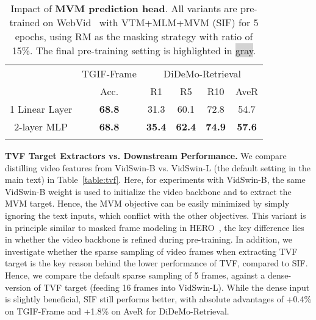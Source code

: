 \documentclass[10pt,twocolumn,letterpaper]{article}
\newlength\savewidth
\newcommand\shline{\noalign{\global\savewidth\arrayrulewidth\global\arrayrulewidth 1pt}\hline\noalign{\global\arrayrulewidth\savewidth}}
\newcommand{\tablestyle}[2]{\setlength{\tabcolsep}{#1}\renewcommand{\arraystretch}{#2}\centering\footnotesize}
\newcommand{\siftgif}{68.8\xspace}
\newcommand{\sifdro}{35.4\xspace}
\newcommand{\sifdrf}{62.4\xspace}
\newcommand{\sifdrt}{74.9\xspace}
\newcommand{\sifaver}{57.6\xspace}
\begin{document}
\begin{table}[H]
\centering
    \tablestyle{7pt}{1.2} 
    \def \w{20pt} 
\begin{tabular}{c| ccccc}
        \shline
        \multirow{2}{*}{MVM Head} & TGIF-Frame & \multicolumn{4}{c}{DiDeMo-Retrieval} \\
        \cmidrule(lr){2-2}\cmidrule(lr){3-6}
         & Acc. & R1 & R5 & R10 & AveR \\
        \hline
         1 Linear Layer & \textbf{68.8} & 31.3 & 60.1 & 72.8 & 54.7\\
         \rowcolor{lightgray}
         2-layer MLP & \textbf{\siftgif} & \textbf{\sifdro} & \textbf{\sifdrf} & \textbf{\sifdrt} & \textbf{\sifaver}\\ 
        \shline
    \end{tabular}
\caption{Impact of \textbf{MVM prediction head}. All
variants are pre-trained on WebVid~\cite{bain2021frozen} with VTM+MLM+MVM (SIF) for 5 epochs, using RM as the masking strategy with ratio of 15\%. The final pre-training setting is highlighted in \colorbox{lightgray}{gray}.}
    \label{table:mvm-webvid-head}
    \vspace{-0.5ex}
\end{table} 
\vspace{0.5ex}
\noindent \textbf{TVF Target Extractors vs. Downstream Performance.} We compare distilling video features from  VidSwin-B vs. VidSwin-L (the default setting in the main text) in Table~\ref{table:tvf}. Here, for experiments with VidSwin-B, the same VidSwin-B weight is used to initialize the video backbone and to extract the MVM target. Hence, the MVM objective can be easily minimized by simply ignoring the text inputs, which conflict with the other objectives. This variant is in principle similar to masked frame modeling in HERO~\cite{li2020hero}, the key difference lies in whether the video backbone is refined during pre-training. In addition, we investigate whether the sparse sampling of video frames when extracting TVF target is the key reason behind the lower performance of TVF, compared to SIF. Hence, we compare the default sparse sampling of 5 frames, against a dense-version of TVF target (feeding 16 frames into VidSwin-L). While the dense input is slightly beneficial, SIF still performs better, with absolute advantages of +0.4\% on TGIF-Frame and +1.8\% on AveR for DiDeMo-Retrieval.
\vspace{-2ex}
\end{document}
